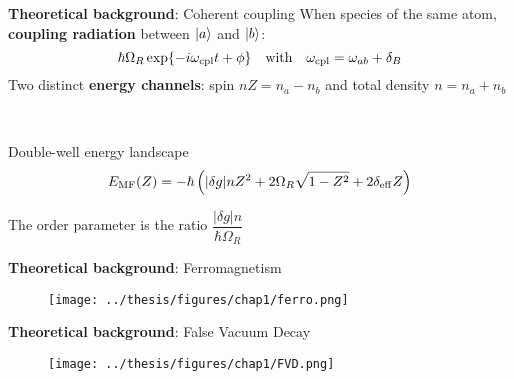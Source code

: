 \documentclass[aspectratio=169]{beamer}
\begin{document}

\begin{frame}{\textbf{Theoretical background}: Coherent coupling}
  When species of the same atom, \textbf{coupling radiation} between $\ket{a}$ and $\ket{b}$:
  \[
      \hbar\Omega_R\exp{-i\omega_{\rm cpl}t+\phi} \quad \text{with} \quad \omega_{\rm cpl} = \omega_{ab} + \delta_B
  \]
  Two distinct \textbf{energy channels}: spin $nZ = n_a-n_b$ and total density $n = n_a+n_b$
  \pause

  ~

  Double-well energy landscape
  \begin{equation*}
      E_{\rm MF}(Z) = -\hbar\left(|\delta g|n Z^2 + 2\Omega_R \sqrt{1-Z^2} + 2\delta_{\rm eff} Z\right)
      \label{eq:E_MF}
  \end{equation*}

  The order parameter is the ratio $\dfrac{|\delta g|n}{\hbar\Omega_R}$
\end{frame}

\begin{frame}{\textbf{Theoretical background}: Ferromagnetism}
  \begin{figure}
      \centering
      \texttt{[image: ../thesis/figures/chap1/ferro.png]}
  \end{figure}
\end{frame}

\begin{frame}{\textbf{Theoretical background}: False Vacuum Decay}
  \begin{figure}
      \centering
      \texttt{[image: ../thesis/figures/chap1/FVD.png]}
  \end{figure}    
\end{frame}
\end{document}
